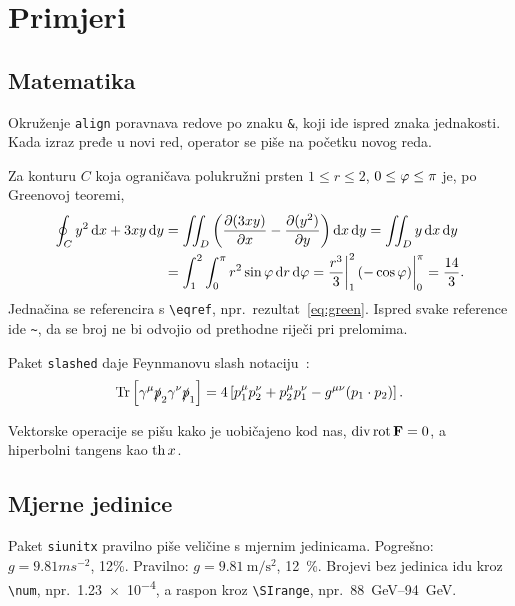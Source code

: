\chapter{Primjeri}
\label{ch:primjeri}

\section{Matematika}

	Okruženje \texttt{align} poravnava redove po znaku \texttt{\&}, koji ide ispred
	znaka jednakosti.
	Kada izraz pređe u novi red, operator se piše na početku novog reda.

	Za konturu $C$ koja ograničava polukružni prsten $1 \le r \le 2$, $0 \le \varphi
		\le \pi$ je, po Greenovoj teoremi,
	\begin{align}
		\oint_{C} y^{2} \dd{x} + 3xy \dd{y}
		 & = \iint_{D} \left( \pdv{(3xy)}{x} - \pdv{(y^{2})}{y} \right) \dd{x} \dd{y}
		= \iint_{D} y \dd{x} \dd{y}
		\nonumber                                                                     \\
		 & = \int_{1}^{2} \int_{0}^{\pi} r^{2} \sin\varphi \dd{r} \dd{\varphi}
		= \frac{r^{3}}{3} \bigg|_{1}^{2} \, (-\cos\varphi) \bigg|_{0}^{\pi}
		= \frac{14}{3}.
		\label{eq:green}
	\end{align}
	Jednačina se referencira s \verb+\eqref+, npr.~rezultat~\eqref{eq:green}.
	Ispred svake reference ide \verb+~+, da se broj ne bi odvojio od prethodne
	riječi pri prelomima.

	Paket \texttt{slashed} daje Feynmanovu slash notaciju~\cite{peskin}:
	\begin{equation}
		\Tr\left[\gamma^{\mu}\slashed{p}_{2}\gamma^{\nu}\slashed{p}_{1}\right]
		= 4\left[p_{1}^{\mu}p_{2}^{\nu} + p_{2}^{\mu}p_{1}^{\nu}
			- g^{\mu\nu}(p_{1} \cdot p_{2})\right].
		\label{eq:trag}
	\end{equation}

	Vektorske operacije se pišu kako je uobičajeno kod nas, $\operatorname{div} \operatorname{rot} \vb{F} =
		0$, a hiperbolni tangens kao $\operatorname{th} x$.

\section{Mjerne jedinice}

	Paket \texttt{siunitx} pravilno piše veličine s mjernim jedinicama.
	Pogrešno: $g = 9.81 ms^{-2}$, 12\%.
	Pravilno: $g = \SI{9.81}{\meter\per\second\squared}$, \SI{12}{\percent}.
	Brojevi bez jedinica idu kroz \verb+\num+, npr.~\num{1.23e-4}, a raspon kroz
	\verb+\SIrange+, npr.~\SIrange{88}{94}{\giga\electronvolt}.

